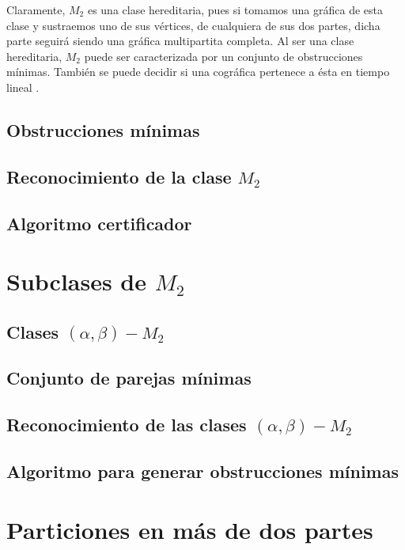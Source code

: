     Claramente, $M_2$ es una clase hereditaria, pues si tomamos una gráfica de esta clase y sustraemos uno de sus vértices, de cualquiera de sus dos partes, dicha parte seguirá siendo una gráfica multipartita completa. Al ser una clase hereditaria, $M_2$ puede ser caracterizada por un conjunto de obstrucciones mínimas. También se puede decidir si una cográfica pertenece a ésta en tiempo lineal \cite{unknown}.

    \subsection{Obstrucciones mínimas}
        

    \subsection{Reconocimiento de la clase $M_2$}
        

    \subsection{Algoritmo certificador}
        

\section{Subclases de $M_2$}

    \subsection{Clases $(\alpha, \beta)-M_2$}

    \subsection{Conjunto de parejas mínimas}

    \subsection{Reconocimiento de las clases $(\alpha, \beta)-M_2$}

    \subsection{Algoritmo para generar obstrucciones mínimas}

\section{Particiones en más de dos partes}
